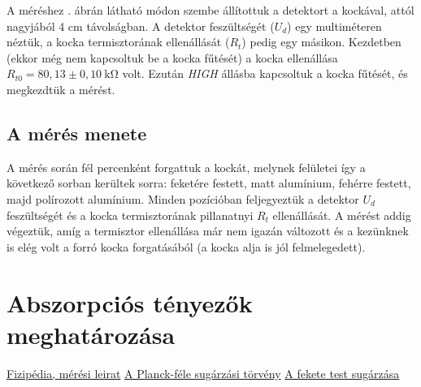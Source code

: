 \documentclass[a4paper, 12pt]{article}
\begin{document}
    A méréshez . ábrán látható módon szembe állítottuk a detektort a kockával, attól nagyjából 4 cm távolságban.
    A detektor feszültségét ($U_d$) egy multiméteren néztük, a kocka termisztorának ellenállását ($R_t$) pedig egy másikon.
    Kezdetben (ekkor még nem kapcsoltuk be a kocka fűtését) a kocka ellenállása $R_{t0}=80,13\pm 0,10~\mathrm{k\Omega}$ volt.
    Ezután \textit{HIGH} állásba kapcsoltuk a kocka fűtését, és megkezdtük a mérést.

    \subsection{A mérés menete}
    A mérés során fél percenként forgattuk a kockát, melynek felületei így a következő sorban kerültek sorra: feketére festett, matt alumínium, fehérre festett, majd polírozott alumínium.
    Minden pozícióban feljegyeztük a detektor $U_d$ feszültségét és a kocka termisztorának pillanatnyi $R_t$ ellenállását.
    A mérést addig végeztük, amíg a termisztor ellenállása már nem igazán változott és a kezünknek is elég volt a forró kocka forgatásából (a kocka alja is jól felmelegedett).


    \section{Abszorpciós tényezők meghatározása}

    \begin{thebibliography}

         \href{https://fizipedia.bme.hu/index.php/H%C5%91m%C3%A9rs%C3%A9kleti_sug%C3%A1rz%C3%A1s_vizsg%C3%A1lata}{Fizipédia, mérési leirat}
         \href{https://en.wikipedia.org/wiki/Planck%27s_law}{A Planck-féle sugárzási törvény}
         \href{https://glossary.periodni.com/glossary.php?en=blackbody+radiation}{A fekete test sugárzása}
    \end{thebibliography}
\end{document}
